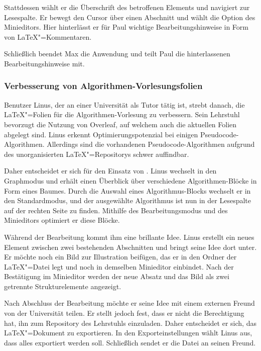 Stattdessen wählt er die Überschrift des betroffenen Elements und navigiert zur Lesespalte.
Er bewegt den Cursor über einen Abschnitt und wählt die Option des Minieditors.
Hier hinterlässt er für Paul wichtige Bearbeitungshinweise in Form von \LaTeX"=Kommentaren.

Schließlich beendet Max die Anwendung und teilt Paul die hinterlassenen Bearbeitungshinweise mit.

\subsubsection{Verbesserung von Algorithmen-Vorlesungsfolien}

Benutzer Linus, der an einer Universität als Tutor tätig ist, strebt danach, die \LaTeX"=Folien für die
Algorithmen-Vorlesung zu verbessern.
Sein Lehrstuhl bevorzugt die Nutzung von Overleaf, auf welchem auch die aktuellen Folien abgelegt sind.
Linus erkennt Optimierungspotenzial bei einigen Pseudocode-Algorithmen.
Allerdings sind die vorhandenen Pseudocode-Algorithmen aufgrund des unorganisierten \LaTeX"=Repositorys schwer
auffindbar.

Daher entscheidet er sich für den Einsatz von \texla{}.
Linus wechselt in den Graphmodus und erhält einen Überblick
über verschiedene Algorithmen-Blöcke in Form eines Baumes.
Durch die Auswahl eines Algorithmus-Blocks wechselt er in den
Standardmodus, und der ausgewählte Algorithmus ist nun in der Lesespalte auf der rechten Seite zu finden.
Mithilfe des Bearbeitungsmodus und des Minieditors optimiert er diese Blöcke.

Während der Bearbeitung kommt ihm eine brillante Idee.
Linus erstellt ein neues Element zwischen zwei bestehenden Abschnitten und bringt seine Idee dort unter.
Er möchte noch ein Bild zur Illustration beifügen, das er in den Ordner der \LaTeX"=Datei legt und noch in demselben
Minieditor einbindet.
Nach der Bestätigung im Minieditor werden der neue Absatz und das Bild als zwei getrennte Strukturelemente angezeigt.

Nach Abschluss der Bearbeitung möchte er seine Idee mit einem externen Freund von der Universität teilen.
Er stellt jedoch fest, dass er nicht die Berechtigung hat, ihn zum Repository des Lehrstuhls einzuladen.
Daher entscheidet er sich, das \LaTeX"=Dokument zu exportieren.
In den Exporteinstellungen wählt Linus aus, dass alles exportiert werden soll.
Schließlich sendet er die Datei an seinen Freund.
